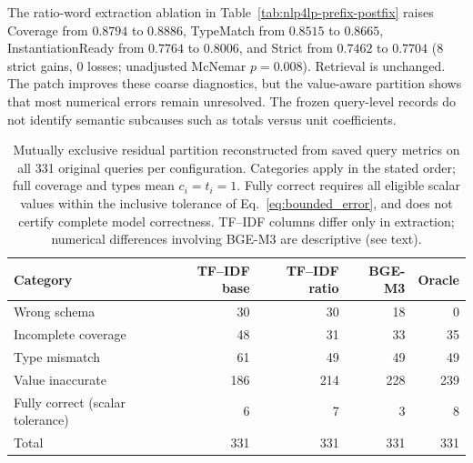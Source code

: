 \documentclass[pdflatex,sn-basic,Numbered]{sn-jnl}
\begin{document}
The ratio-word extraction ablation in Table~\ref{tab:nlp4lp-prefix-postfix} raises Coverage from $0.8794$ to $0.8886$, TypeMatch from $0.8515$ to $0.8665$, InstantiationReady from $0.7764$ to $0.8006$, and Strict from $0.7462$ to $0.7704$ (8 strict gains, 0 losses; unadjusted McNemar $p=0.008$). Retrieval is unchanged. The patch improves these coarse diagnostics, but the value-aware partition shows that most numerical errors remain unresolved. The frozen query-level records do not identify semantic subcauses such as totals versus unit coefficients.

\begin{table}[t]
  \centering
  \caption{Mutually exclusive residual partition reconstructed from saved query metrics on all 331 original queries per configuration. Categories apply in the stated order; full coverage and types mean $c_i=t_i=1$. Fully correct requires all eligible scalar values within the inclusive tolerance of Eq.~\eqref{eq:bounded_error}, and does not certify complete model correctness. TF--IDF columns differ only in extraction; numerical differences involving BGE-M3 are descriptive (see text).}
  \label{tab:nlp4lp-error-taxonomy}
  \small
  \setlength{\tabcolsep}{4pt}
  \begin{tabular}{lrrrr}
    \toprule
    Category & TF--IDF base & TF--IDF ratio & BGE-M3 & Oracle \\
    \midrule
Wrong schema & 30 & 30 & 18 & 0 \\
Incomplete coverage & 48 & 31 & 33 & 35 \\
Type mismatch & 61 & 49 & 49 & 49 \\
Value inaccurate & 186 & 214 & 228 & 239 \\
Fully correct (scalar tolerance) & 6 & 7 & 3 & 8 \\
Total & 331 & 331 & 331 & 331 \\
    \bottomrule
  \end{tabular}
\end{table}
\end{document}
